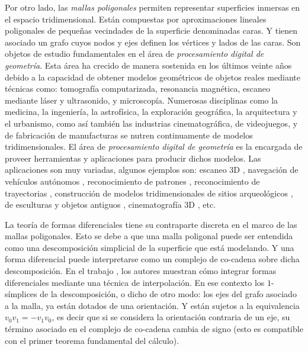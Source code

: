 \documentclass[conference,compsoc,a4paper]{IEEEtran}
\begin{document}
\bigskip

Por otro lado, las \textit{mallas poligonales} 
\cite{BKPAL:2010} permiten representar superficies inmersas en el 
espacio tridimensional. Están compuestas por aproximaciones lineales 
poligonales de pequeñas vecindades de la superficie denominadas caras. 
Y tienen asociado un grafo cuyos nodos y ejes definen los vértices y 
lados de las caras. Son objetos de estudio fundamentales en el área de 
\textit{procesamiento digital de geometría}. Esta área ha crecido de 
manera sostenida en los últimos veinte años debido a la capacidad de 
obtener modelos geométricos de objetos reales mediante técnicas como: 
tomografía computarizada, resonancia magnética, escaneo mediante láser y 
ultrasonido, y microscopía. Numerosas disciplinas como la medicina, la 
ingeniería, la astrofísica, la exploración geográfica, la arquitectura 
y el urbanismo, como así también las industrias cinematográfica, de 
videojuegos, y de fabricación de manufacturas se nutren continuamente 
de modelos tridimensionales. El área de \textit{procesamiento digital 
de geometría} es la encargada de proveer herramientas y aplicaciones 
para producir dichos modelos. Las aplicaciones son muy variadas, 
algunos ejemplos son: escaneo 3D 
\cite{LRAT:2008}, navegación de vehículos autónomos \cite{CMT:2008}, 
reconocimiento de patrones \cite{TC:1992}, 
reconocimiento de trayectorias \cite{ZT:2009}, construcción de modelos 
tridimensionales de sitios arqueológicos \cite{REVEAL}, de esculturas 
y objetos antiguos \cite{BMMRT:2002}, cinematografía 3D 
\cite{RT:2007}, etc.

\bigskip

La teoría de formas diferenciales tiene su contraparte discreta en el 
marco de las mallas poligonales. Esto se debe a que una malla poligonal 
puede ser entendida como una descomposición simplicial 
\cite{Hatcher:2004} de la superficie que está modelando. Y una forma 
diferencial puede interpretarse como un complejo de co-cadena sobre 
dicha descomposición. En el trabajo \cite{DKT:2006}, los autores 
muestran cómo integrar formas diferenciales mediante una técnica de 
interpolación. En ese contexto los $1$-símplices de la descomposición, 
o dicho de otro modo: los ejes del grafo asociado a la malla, ya están 
dotados de una orientación. Y están sujetos a la equivalencia 
${v_0v_1} = -{v_1v_0}$, es decir que si se considera la orientación 
contraria de un eje, su término asociado en el complejo de co-cadena 
cambia de signo (esto es compatible con el primer teorema fundamental 
del cálculo). 
\end{document}
